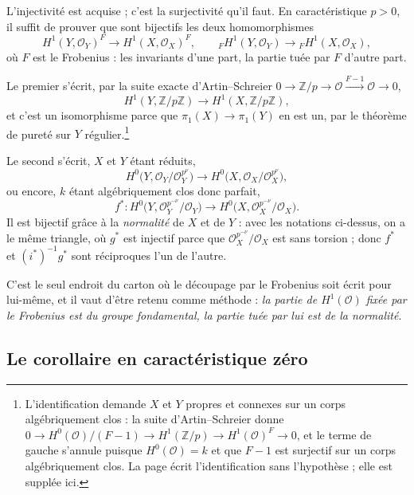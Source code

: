 \documentclass[11pt,a4paper]{article}
\begin{document}
L'injectivité est acquise ; c'est la surjectivité qu'il faut. En caractéristique
$p > 0$, il suffit de prouver que sont bijectifs les deux homomorphismes
\[
  H^{1}(Y, \mathcal{O}_{Y})^{F} \longrightarrow H^{1}(X, \mathcal{O}_{X})^{F} ,
  \qquad
  {}_{F}H^{1}(Y, \mathcal{O}_{Y}) \longrightarrow
  {}_{F}H^{1}(X, \mathcal{O}_{X}) ,
\]
où $F$ est le Frobenius : les invariants d'une part, la partie tuée par $F$
d'autre part.

Le premier s'écrit, par la suite exacte d'Artin--Schreier
$0 \to \mathbb{Z}/p \to \mathcal{O} \xrightarrow{F-1} \mathcal{O} \to 0$,
\[
  H^{1}(Y, \mathbb{Z}/p\mathbb{Z}) \longrightarrow
  H^{1}(X, \mathbb{Z}/p\mathbb{Z}) ,
\]
et c'est un isomorphisme parce que $\pi_{1}(X) \to \pi_{1}(Y)$ en est un, par
le théorème de pureté sur $Y$ régulier.\footnote{L'identification demande
$X$ et $Y$ propres et connexes sur un corps algébriquement clos : la suite
d'Artin--Schreier donne
$0 \to H^{0}(\mathcal{O})/(F-1) \to H^{1}(\mathbb{Z}/p) \to
H^{1}(\mathcal{O})^{F} \to 0$, et le terme de gauche s'annule puisque
$H^{0}(\mathcal{O}) = k$ et que $F-1$ est surjectif sur un corps
algébriquement clos. La page écrit l'identification sans l'hypothèse ; elle est
supplée ici.}

Le second s'écrit, $X$ et $Y$ étant réduits,
\[
  H^{0}\bigl(Y, \mathcal{O}_{Y}/\mathcal{O}_{Y}^{p^{\nu}}\bigr) \longrightarrow
  H^{0}\bigl(X, \mathcal{O}_{X}/\mathcal{O}_{X}^{p^{\nu}}\bigr) ,
\]
ou encore, $k$ étant algébriquement clos donc parfait,
\[
  f^{*} : H^{0}\bigl(Y, \mathcal{O}_{Y}^{p^{-\nu}}/\mathcal{O}_{Y}\bigr)
  \longrightarrow
  H^{0}\bigl(X, \mathcal{O}_{X}^{p^{-\nu}}/\mathcal{O}_{X}\bigr) .
\]
Il est bijectif grâce à la \emph{normalité} de $X$ et de $Y$ : avec les
notations ci-dessus, on a le même triangle, où $g^{*}$ est injectif parce que
$\mathcal{O}_{X}^{p^{-\nu}}/\mathcal{O}_{X}$ est sans torsion ; donc $f^{*}$ et
$(i^{*})^{-1}g^{*}$ sont réciproques l'un de l'autre.


C'est le seul endroit du carton où le découpage par le Frobenius soit écrit
pour lui-même, et il vaut d'être retenu comme méthode : \emph{la partie de
$H^{1}(\mathcal{O})$ fixée par le Frobenius est du groupe fondamental, la
partie tuée par lui est de la normalité}.

\subsection*{Le corollaire en caractéristique zéro}
\end{document}
